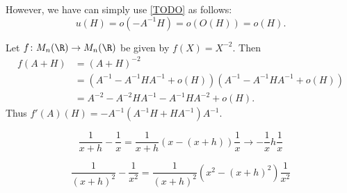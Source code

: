 \begin{examples}
    However, we have can simply use \cref{TODO} as follows: \[
        u(H) = o(-A^{-1}H) = o(O(H)) = o(H).
    \]
    \item Let $f\colon M_n(\R) \to M_n(\R)$ be given by $f(X) = X^{-2}$.
    Then \begin{align*}
        f(A + H) &= (A + H)^{-2} \\
            &= (A^{-1} - A^{-1}HA^{-1} + o(H))
                (A^{-1} - A^{-1}HA^{-1} + o(H)) \\
            &= A^{-2} - A^{-2}HA^{-1} - A^{-1}HA^{-2} + o(H).
    \end{align*}
    Thus $f'(A)(H) = -A^{-1} (A^{-1} H + H A^{-1}) A^{-1}$.
\end{examples}
\begin{remarks}
    \item \[
        \frac1{x+h} - \frac1x = \frac1{x+h} (x - (x + h)) \frac1x
        \to -\frac1x h \frac1x
    \]
    \item \[
        \frac1{(x+h)^2} - \frac1{x^2}
            = \frac1{(x+h)^2} (x^2 - (x + h)^2) \frac1{x^2}
    \]
\end{remarks}

